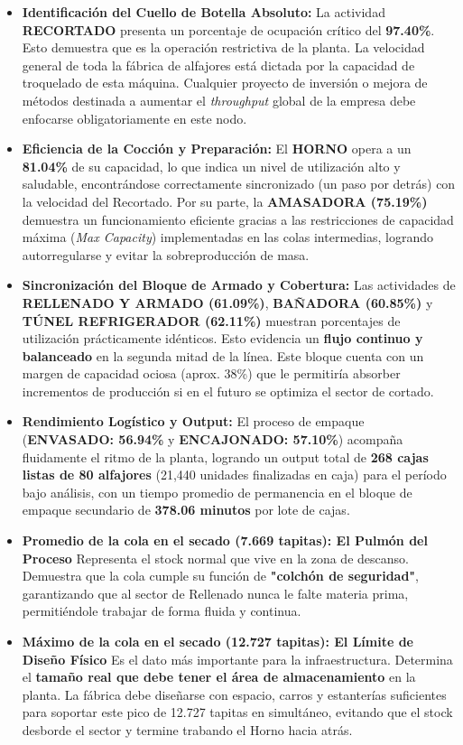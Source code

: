\documentclass[runningheads]{llncs}
\begin{document}
\begin{itemize}
    \item \textbf{Identificación del Cuello de Botella Absoluto:} La actividad \textbf{RECORTADO} presenta un porcentaje de ocupación crítico del \textbf{97.40\%}. Esto demuestra que es la operación restrictiva de la planta. La velocidad general de toda la fábrica de alfajores está dictada por la capacidad de troquelado de esta máquina. Cualquier proyecto de inversión o mejora de métodos destinada a aumentar el \textit{throughput} global de la empresa debe enfocarse obligatoriamente en este nodo.
    \item \textbf{Eficiencia de la Cocción y Preparación:} El \textbf{HORNO} opera a un \textbf{81.04\%} de su capacidad, lo que indica un nivel de utilización alto y saludable, encontrándose correctamente sincronizado (un paso por detrás) con la velocidad del Recortado. Por su parte, la \textbf{AMASADORA (75.19\%)} demuestra un funcionamiento eficiente gracias a las restricciones de capacidad máxima (\textit{Max Capacity}) implementadas en las colas intermedias, logrando autorregularse y evitar la sobreproducción de masa.
    \item \textbf{Sincronización del Bloque de Armado y Cobertura:} Las actividades de \textbf{RELLENADO Y ARMADO (61.09\%)}, \textbf{BAÑADORA (60.85\%)} y \textbf{TÚNEL REFRIGERADOR (62.11\%)} muestran porcentajes de utilización prácticamente idénticos. Esto evidencia un \textbf{flujo continuo y balanceado} en la segunda mitad de la línea. Este bloque cuenta con un margen de capacidad ociosa (aprox. 38\%) que le permitiría absorber incrementos de producción si en el futuro se optimiza el sector de cortado.
    \item \textbf{Rendimiento Logístico y Output:} El proceso de empaque (\textbf{ENVASADO: 56.94\%} y \textbf{ENCAJONADO: 57.10\%}) acompaña fluidamente el ritmo de la planta, logrando un output total de \textbf{268 cajas listas de 80 alfajores} (21,440 unidades finalizadas en caja) para el período bajo análisis, con un tiempo promedio de permanencia en el bloque de empaque secundario de \textbf{378.06 minutos} por lote de cajas.
    \item \textbf{Promedio de la cola en el secado (7.669 tapitas): El Pulmón del Proceso} Representa el stock normal que vive en la zona de descanso. Demuestra que la cola cumple su función de \textbf{"colchón de seguridad"}, garantizando que al sector de Rellenado nunca le falte materia prima, permitiéndole trabajar de forma fluida y continua.
    \item \textbf{Máximo de la cola en el secado (12.727 tapitas): El Límite de Diseño Físico} Es el dato más importante para la infraestructura. Determina el \textbf{tamaño real que debe tener el área de almacenamiento} en la planta. La fábrica debe diseñarse con espacio, carros y estanterías suficientes para soportar este pico de 12.727 tapitas en simultáneo, evitando que el stock desborde el sector y termine trabando el Horno hacia atrás. 

\end{itemize}
\end{document}
